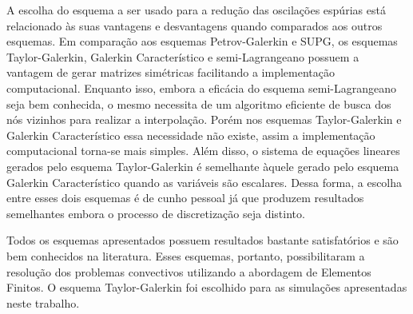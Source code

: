 


\medskip
A escolha do esquema a ser usado para a redução das oscilações espúrias está relacionado
às suas vantagens e desvantagens quando comparados aos outros esquemas.
Em comparação aos esquemas Petrov-Galerkin e SUPG, os esquemas Taylor-Galerkin,
Galerkin Característico e semi-Lagrangeano possuem a vantagem
de gerar matrizes simétricas facilitando a implementação computacional.
Enquanto isso, embora a eficácia do esquema semi-Lagrangeano seja bem conhecida, o mesmo necessita
de um algoritmo eficiente de busca dos nós vizinhos para realizar a interpolação. Porém nos esquemas Taylor-Galerkin
e Galerkin Característico essa necessidade não existe, assim a implementação computacional torna-se mais simples.
Além disso, o sistema de equações lineares gerados pelo esquema Taylor-Galerkin 
é semelhante àquele gerado pelo esquema Galerkin Característico quando as variáveis são escalares. 
Dessa forma, a escolha entre esses dois esquemas é de cunho pessoal já que produzem
resultados semelhantes embora o processo de discretização seja distinto.

\medskip
Todos os esquemas apresentados possuem resultados bastante satisfatórios
e são bem conhecidos na literatura. Esses esquemas, portanto,
possibilitaram a resolução dos problemas convectivos utilizando a abordagem de Elementos Finitos. 
O esquema Taylor-Galerkin foi escolhido para as simulações apresentadas neste trabalho. 


